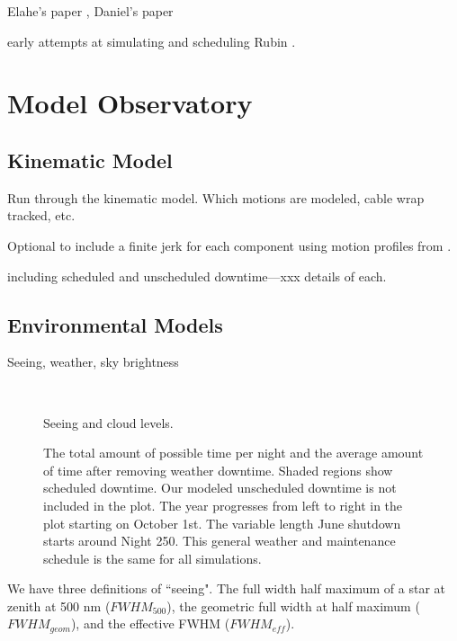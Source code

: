 \documentclass[]{aastex631}
\begin{document}
Elahe's paper \citet{Naghib2019}, Daniel's paper \citep{Rothchild2019}



early attempts at simulating and scheduling Rubin \citet{Delgado2014, Delgado2016SPIE}.



\section{Model Observatory}\label{sec:model_obs}

\subsection{Kinematic Model}

Run through the kinematic model. Which motions are modeled, cable wrap tracked, etc.

Optional to include a finite jerk for each component using motion profiles from \citet{Mu2009}.

including scheduled and unscheduled downtime---xxx details of each.


\subsection{Environmental Models}
Seeing, weather, sky brightness

\begin{figure}
    \centering
     \\
    \caption{Seeing and cloud levels.}
    \label{fig:seeing_clouds}
\end{figure}


\begin{figure}
    \centering
    \caption{The total amount of possible time per night and the average amount of time
after removing weather downtime. Shaded regions show scheduled downtime. Our modeled
unscheduled downtime is not included in the plot. The year progresses from left to right in
the plot starting on October 1st. The variable length June shutdown starts around Night
250. This general weather and maintenance schedule is the same for all simulations.}
    \label{fig:downtime}
\end{figure}

We have three definitions of ``seeing". The full width half maximum of a star at zenith at 500 nm ($FWHM_{500}$), the geometric full width at half maximum ($FWHM_{geom}$), and the effective FWHM ($FWHM_{eff}$).
\end{document}
